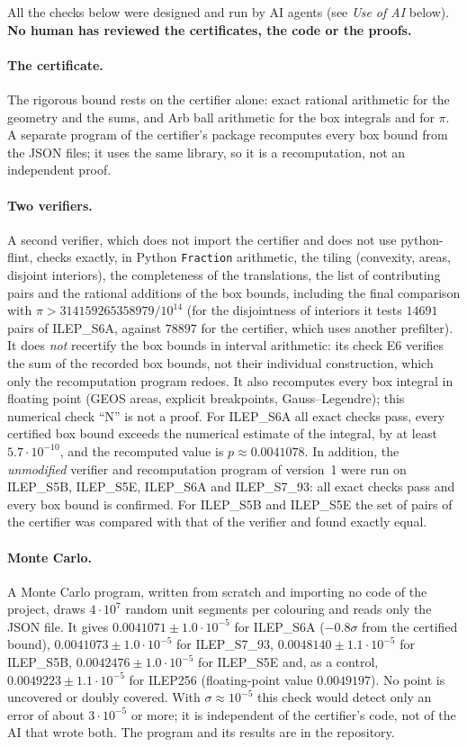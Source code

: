 \documentclass[10pt,a4paper]{article}
\begin{document}
All the checks below were designed and run by AI agents (see \emph{Use of AI} below). \textbf{No human has reviewed
the certificates, the code or the proofs.}

\paragraph{The certificate.} The rigorous bound rests on the certifier alone: exact rational arithmetic for
the geometry and the sums, and Arb ball arithmetic for the box integrals and for $\pi$. A separate program of
the certifier's package recomputes every box bound from the JSON files; it uses the same library, so it is a
recomputation, not an independent proof.

\paragraph{Two verifiers.} A second verifier, which does not import the certifier and does not use
python-flint, checks exactly, in Python \texttt{Fraction} arithmetic, the tiling (convexity, areas, disjoint
interiors), the completeness of the translations, the list of contributing pairs and the rational additions of
the box bounds, including the final comparison with $\pi>314159265358979/10^{14}$ (for the disjointness of
interiors it tests $14691$ pairs of ILEP\_S6A, against $78897$ for the certifier, which uses another prefilter).
It does \emph{not} recertify the box bounds in interval arithmetic: its check E6 verifies the sum of the recorded
box bounds, not their individual construction, which only the recomputation program redoes. It also recomputes every box integral in floating point
(GEOS areas, explicit breakpoints, Gauss--Legendre); this numerical check ``N'' is not a proof. For
ILEP\_S6A all exact checks pass, every certified box bound exceeds the numerical estimate of the integral, by at least
$5.7\cdot10^{-10}$, and the recomputed value is $p\approx0.0041078$. In addition, the \emph{unmodified}
verifier and recomputation program of version~1 were run on ILEP\_S5B, ILEP\_S5E, ILEP\_S6A and
ILEP\_S7\_93: all exact checks pass and every box bound is confirmed. For ILEP\_S5B and ILEP\_S5E the set of
pairs of the certifier was compared with that of the verifier and found exactly equal.

\paragraph{Monte Carlo.} A Monte Carlo program, written from scratch and importing no code of the project,
draws $4\cdot10^7$ random unit segments per colouring and reads only the JSON file. It gives
$0.0041071\pm1.0\cdot10^{-5}$ for ILEP\_S6A ($-0.8\sigma$ from the certified bound),
$0.0041073\pm1.0\cdot10^{-5}$ for ILEP\_S7\_93, $0.0048140\pm1.1\cdot10^{-5}$ for ILEP\_S5B,
$0.0042476\pm1.0\cdot10^{-5}$ for ILEP\_S5E and, as a control, $0.0049223\pm1.1\cdot10^{-5}$ for ILEP256
(floating-point value $0.0049197$). No point is uncovered or doubly covered. With $\sigma\approx10^{-5}$ this
check would detect only an error of about $3\cdot10^{-5}$ or more; it is independent of the certifier's code,
not of the AI that wrote both. The program and its results are in the repository.
\end{document}

